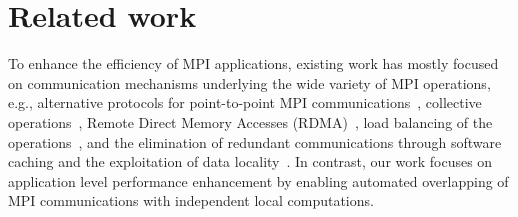 
\section{Related work}
\label{sec-related}

To enhance the efficiency of MPI applications, existing work has mostly focused on
communication mechanisms underlying the wide variety of MPI operations,  e.g.,
alternative protocols for point-to-point MPI communications~\cite{brightwell:eurompi03,denis:eurompi11},
collective operations~\cite{traff:eurompi14:ocd,traff:eurompi14:mcd,graham:eurompi08,mittal:ppopp12},
Remote Direct Memory Accesses (RDMA)~\cite{liu:ics03,woodall:eurompi06,hatanaka:eurompi13},
load balancing of the operations~\cite{nian:niss09,kale:eurompi14},
and the elimination of redundant communications through software caching and the exploitation of data locality~\cite{buntinas:icpp09,isujita:eurompi14,ozog:ics13}.
In contrast, our work focuses on application level performance enhancement by enabling automated overlapping of MPI communications with independent local computations.

